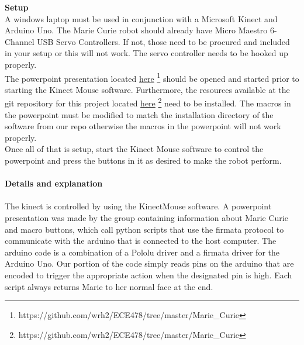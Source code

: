\documentclass[12pt]{article}
\begin{document}
\begin{description}
		\textbf{Setup} \hfill \\
		A windows laptop must be used in conjunction with a Microsoft Kinect and Arduino Uno. The Marie Curie robot should already have Micro Maestro 6-Channel USB Servo Controllers. If not, those need to be procured and included in your setup or this will not work. The servo controller needs to be hooked up properly. \\
		The powerpoint presentation located \href{https://github.com/wrh2/ECE478/tree/master/Marie_Curie}{here} \footnote{https://github.com/wrh2/ECE478/tree/master/Marie\_Curie} should be opened and started prior to starting the Kinect Mouse software. Furthermore, the resources available at the git repository for this project located \href{https://github.com/wrh2/ECE478/tree/master/Marie\_Curie}{here} \footnote{https://github.com/wrh2/ECE478/tree/master/Marie\_Curie} need to be installed. The macros in the powerpoint must be modified to match the installation directory of the software from our repo otherwise the macros in the powerpoint will not work properly. \\
		Once all of that is setup, start the Kinect Mouse software to control the powerpoint and press the buttons in it as desired to make the robot perform.\\ \\
		\textbf{Details and explanation} \hfill \\ \\
		The kinect is controlled by using the KinectMouse software. A powerpoint presentation was made by the group containing information about Marie Curie and macro buttons, which call python scripts that use the firmata protocol to communicate with the arduino that is connected to the host computer. The arduino code is a combination of a Pololu driver and a firmata driver for the Arduino Uno. Our portion of the code simply reads pins on the arduino that are encoded to trigger the appropriate action when the designated pin is high. Each script always returns Marie to her normal face at the end.
		

\end{description}
\end{document}
